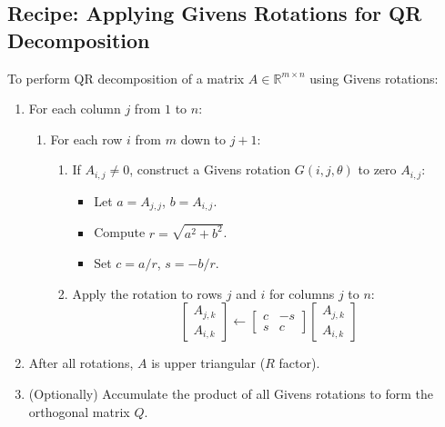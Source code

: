 \subsection{Recipe: Applying Givens Rotations for QR Decomposition}

To perform QR decomposition of a matrix $A \in \mathbb{R}^{m \times n}$ using Givens rotations:

\begin{enumerate}
    \item For each column $j$ from $1$ to $n$:
          \begin{enumerate}
              \item For each row $i$ from $m$ down to $j+1$:
                    \begin{enumerate}
                        \item If $A_{i,j} \neq 0$, construct a Givens rotation $G(i, j, \theta)$ to zero $A_{i,j}$:
                              \begin{itemize}
                                  \item Let $a = A_{j,j}$, $b = A_{i,j}$.
                                  \item Compute $r = \sqrt{a^2 + b^2}$.
                                  \item Set $c = a/r$, $s = -b/r$.
                              \end{itemize}
                        \item Apply the rotation to rows $j$ and $i$ for columns $j$ to $n$:
                              \[
                                  \begin{bmatrix}
                                      A_{j,k} \\
                                      A_{i,k}
                                  \end{bmatrix}
                                  \gets
                                  \begin{bmatrix}
                                      c & -s \\
                                      s & c
                                  \end{bmatrix}
                                  \begin{bmatrix}
                                      A_{j,k} \\
                                      A_{i,k}
                                  \end{bmatrix}
                              \]
                    \end{enumerate}
          \end{enumerate}
    \item After all rotations, $A$ is upper triangular ($R$ factor).
    \item (Optionally) Accumulate the product of all Givens rotations to form the orthogonal matrix $Q$.
\end{enumerate}

